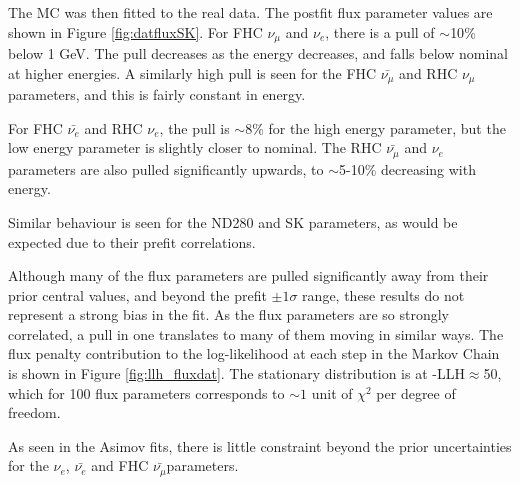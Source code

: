 The MC was then fitted to the real data. The postfit flux parameter values are shown in Figure \ref{fig:datfluxSK}. For FHC $\nu_{\mu}$ and $\nu_e$, there is a pull of $\sim$10$\%$ below 1 GeV. The pull decreases as the energy decreases, and falls below nominal at higher energies. A similarly high pull is seen for the FHC $\bar{\nu_{\mu}}$ and RHC $\nu_{\mu}$ parameters, and this is fairly constant in energy.

For FHC $\bar{\nu_e}$ and RHC $\nu_e$, the pull is $\sim8\%$ for the high energy parameter, but the low energy parameter is slightly closer to nominal. The RHC $\bar{\nu_{\mu}}$ and $\nu_e$ parameters are also pulled significantly upwards, to $\sim$5-10$\%$ decreasing with energy.

Similar behaviour is seen for the ND280 and SK parameters, as would be expected due to their prefit correlations.

Although many of the flux parameters are pulled significantly away from their prior central values, and beyond the prefit $\pm1\sigma$ range, these results do not represent a strong bias in the fit. As the flux parameters are so strongly correlated, a pull in one translates to many of them moving in similar ways. The flux penalty contribution to the log-likelihood at each step in the Markov Chain is shown in Figure \ref{fig:llh_fluxdat}. The stationary distribution is at -LLH$\approx$50, which for 100 flux parameters corresponds to $\sim1$ unit of $\chi^2$ per degree of freedom.

As seen in the Asimov fits, there is little constraint beyond the prior uncertainties for the $\nu_e$, $\bar{\nu_e}$ and FHC $\bar{\nu_{\mu}}$parameters.

